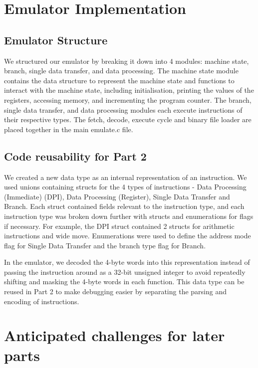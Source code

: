\documentclass{article}
\begin{document}
\section{Emulator Implementation}
\subsection{Emulator Structure}
We structured our emulator by breaking it down into 4 modules: machine state, branch, single data transfer, and data processing. The machine state module contains the data structure to represent the machine state and functions to interact with the machine state, including initialisation, printing the values of the registers, accessing memory, and incrementing the program counter. The branch, single data transfer, and data processing modules each execute instructions of their respective types. The fetch, decode, execute cycle and binary file loader are placed together in the main emulate.c file.

\subsection{Code reusability for Part 2}
We created a new data type as an internal representation of an instruction. We used unions containing structs for the 4 types of instructions - Data Processing (Immediate) (DPI), Data Processing (Register), Single Data Transfer and Branch. Each struct contained fields relevant to the instruction type, and each instruction type was broken down further with structs and enumerations for flags if necessary. For example, the DPI struct contained 2 structs for arithmetic instructions and wide move. Enumerations were used to define the address mode flag for Single Data Transfer and the branch type flag for Branch.
\newline 

In the emulator, we decoded the 4-byte words into this representation instead of passing the instruction around as a 32-bit unsigned integer to avoid repeatedly shifting and masking the 4-byte words in each function. This data type can be reused in Part 2 to make debugging easier by separating the parsing and encoding of instructions.

\section{Anticipated challenges for later parts}
\end{document}
